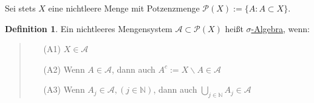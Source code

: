 \documentclass[a4paper]{report}
\newcommand{\PowerSet}{\mathcal{P}}
\newcommand{\N}{\mathbb{N}}
\newcommand{\jlabel}[1]{\label{j_#1}}
\theoremstyle{plain}
\theoremstyle{definition}
\newtheorem{defn}[thm]{Definition}
\begin{document}
Sei stets $X$ eine nichtleere Menge mit Potzenzmenge $\PowerSet(X) := \{A : A \subset X\}$.


\begin{defn}
\jlabel{Def 1.1}
    Ein nichtleeres Mengensystem $\mathcal{A} \subset \PowerSet(X)$ heißt \uline{$\sigma$-Algebra}, wenn:
    \begin{quote}
    \begin{itemize}
        \item[(A1)] $X \in \mathcal{A}$
        \item[(A2)] Wenn $A \in \mathcal{A}$, dann auch $A^c := X \backslash A \in \mathcal{A}$
        \item[(A3)] Wenn $A_j \in \mathcal{A}, (j \in \N)$, dann auch $\bigcup_{j \in \N} A_j \in \mathcal{A}$
    \end{itemize}
    \end{quote}
\end{defn}
\end{document}

